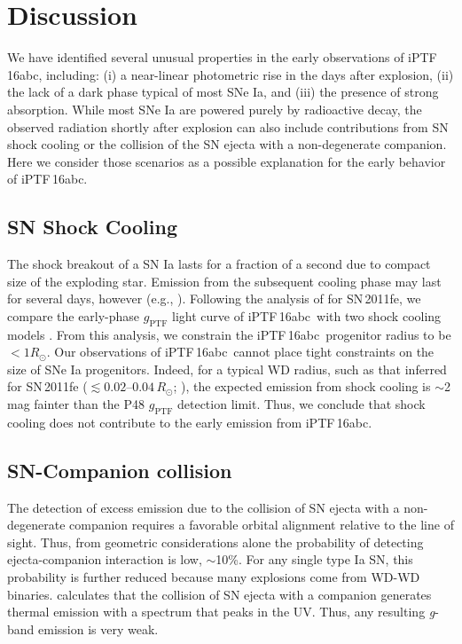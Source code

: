 \documentclass[twocolumn]{aastex61}
\newcommand{\sr}{R_\odot}
\newcommand{\abc}{iPTF\,16abc}
\begin{document}
\section{Discussion}
\label{sec:lc_energy}

We have identified several unusual properties in the early observations of \abc, including: (i) a near-linear photometric rise in the days after explosion, (ii) the lack of a dark phase typical of most SNe Ia, and (iii) the presence of strong  absorption. While most SNe Ia are powered purely by radioactive decay, the observed radiation shortly after explosion can also include contributions 
from SN shock cooling or the collision of the SN ejecta with a non-degenerate companion. Here we consider those scenarios as a possible explanation for the early behavior of \abc. 

\subsection{SN Shock Cooling}

The shock breakout of a SN Ia lasts for a fraction of a second due to
compact size of the exploding star. Emission from the subsequent 
cooling phase may last for several days, however (e.g., 
\citealt{2010ApJ...708..598P}). Following the analysis of \citet{2012ApJ...744L..17B} for SN\,2011fe, we
compare the early-phase $g_\mathrm{PTF}$ light curve of \abc\ with
two shock cooling models \citep{2011ApJ...728...63R, 
2010ApJ...708..598P}. From this analysis, we constrain the \abc\ 
progenitor radius to be $<1\sr$. Our observations of \abc\ cannot 
place tight constraints on the size of SNe Ia progenitors. Indeed, 
for a typical WD radius, such as that inferred for SN\,2011fe 
($\lesssim 0.02$--$0.04\,\sr$; \citealt{2012ApJ...744L..17B, 
2014ApJ...784...85P}), the expected emission from shock cooling is 
$\sim$2 mag fainter than the P48 $g_\mathrm{PTF}$ detection limit. 
Thus, we conclude that shock cooling does not contribute to the 
early emission from \abc.

\subsection{SN-Companion collision}

The detection of excess emission due to the collision of SN ejecta 
with a non-degenerate companion requires a favorable orbital 
alignment relative to the line of sight. Thus, from geometric 
considerations alone the probability of detecting ejecta-companion 
interaction is low, $\sim$10\%. For any single type Ia SN, this 
probability is further reduced because many explosions come from 
WD-WD binaries. \citet{2010ApJ...708.1025K} calculates that the 
collision of SN ejecta with a companion  
generates thermal emission with a spectrum that peaks in the 
UV. Thus, any resulting \textit{g}-band emission is very weak.
\end{document}
